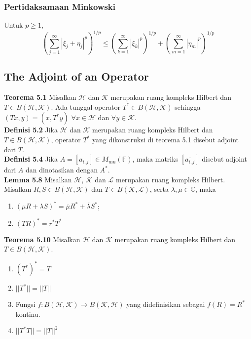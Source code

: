 \documentclass{article}
\begin{document}
\begin{multicols}{2}
  \subsubsection*{Pertidaksamaan Minkowski}
  Untuk \( p \ge 1 \),
  \[
    \left( \sum_{j=1}^{\infty} |\xi_j + \eta_j|^p \right)^{1/p}
    \le
    \left( \sum_{k=1}^{\infty} |\xi_k|^p \right)^{1/p}
    +
    \left( \sum_{m=1}^{\infty} |\eta_m|^p \right)^{1/p}
  \]

  \pagebreak
  \subsection*{The Adjoint of an Operator}
  \textbf{Teorema 5.1} Misalkan $\mathcal{H}$ dan $\mathcal{K}$ merupakan ruang kompleks Hilbert dan $T \in B(\mathcal{H,K})$. Ada tunggal operator $T^* \in B(\mathcal{H,K})$ sehingga $(Tx,y)=(x,T^*y)$ $\forall x \in \mathcal{H}$ dan $\forall y \in \mathcal{K}.$\\

  \textbf{Definisi 5.2} Jika $\mathcal{H}$ dan $\mathcal{K}$ merupakan ruang kompleks Hilbert dan $T \in B(\mathcal{H,K})$, operator $T^*$ yang dikonstruksi di teorema 5.1 disebut adjoint dari $T$.\\

  \textbf{Definisi 5.4} Jika $A=[a_{i,j}] \in M_{mn}(\mathbb{F})$, maka matriks $[\overline{a_{i,j}}]$ disebut adjoint dari $A$ dan dinotasikan dengan $A^*$.\\

  \textbf{Lemma 5.8} Misalkan $\mathcal{H}$, $\mathcal{K}$ dan $\mathcal{L}$ merupakan ruang kompleks Hilbert. Misalkan $R,S \in B(\mathcal{H,K})$ dan $T \in B(\mathcal{K,L})$, serta $\lambda, \mu\in \mathbb{C}$, maka
  \begin{enumerate}
    \item $(\mu R+\lambda S)^*=\overline{\mu}R^*+\overline{\lambda}S^*$;
    \item $(TR)^*=r^*T^*$
  \end{enumerate}

  \textbf{Teorema 5.10} Misalkan $\mathcal{H}$ dan $\mathcal{K}$ merupakan ruang kompleks Hilbert dan $T \in B(\mathcal{H,K})$.
  \begin{enumerate}
    \item $(T^*)^*=T$
    \item $||T^*||=||T||$
    \item Fungsi $f : B(\mathcal{H,K}) \to B(\mathcal{K,H})$ yang didefinisikan sebagai $f(R)=R^*$ kontinu.
    \item $||T^*T||=||T||^2$
  \end{enumerate}


\end{multicols}
\end{document}
